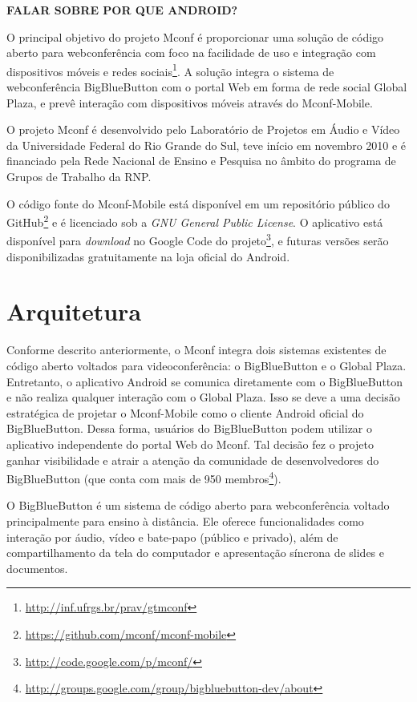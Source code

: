 \documentclass{acm_proc_article-sp}
\newcommand{\todo}[1]{\textcolor[rgb]{1.00,0.00,0.00}{\bf \uppercase{#1}}}
\begin{document}
\todo{falar sobre por que android?}

O principal objetivo do projeto Mconf é proporcionar uma solução de código aberto para webconferência com foco na facilidade de uso e integração com dispositivos móveis e redes sociais\footnote{\url{http://inf.ufrgs.br/prav/gtmconf}}. A solução integra o sistema de webconferência BigBlueButton com o portal Web em forma de rede social Global Plaza, e prevê interação com dispositivos móveis através do Mconf-Mobile.

O projeto Mconf é desenvolvido pelo Laboratório de Projetos em Áudio e Vídeo da Universidade Federal do Rio Grande do Sul, teve início em novembro 2010 e é financiado pela Rede Nacional de Ensino e Pesquisa no âmbito do programa de Grupos de Trabalho da RNP.

O código fonte do Mconf-Mobile está disponível em um repositório público do GitHub\footnote{\url{https://github.com/mconf/mconf-mobile}} e é licenciado sob a \emph{GNU General Public License}. O aplicativo está disponível para \emph{download} no Google Code do projeto\footnote{\url{http://code.google.com/p/mconf/}}, e futuras versões serão disponibilizadas gratuitamente na loja oficial do Android.


\section{Arquitetura}\label{sec:arquitetura}

Conforme descrito anteriormente, o Mconf integra dois sistemas existentes de código aberto voltados para videoconferência: o BigBlueButton e o Global Plaza. Entretanto, o aplicativo Android se comunica diretamente com o BigBlueButton e não realiza qualquer interação com o Global Plaza. Isso se deve a uma decisão estratégica de projetar o Mconf-Mobile como o cliente Android oficial do BigBlueButton. Dessa forma, usuários do BigBlueButton podem utilizar o aplicativo independente do portal Web do Mconf. Tal decisão fez o projeto ganhar visibilidade e atrair a atenção da comunidade de desenvolvedores do BigBlueButton (que conta com mais de 950 membros\footnote{\url{http://groups.google.com/group/bigbluebutton-dev/about}}).

O BigBlueButton é um sistema de código aberto para webconferência voltado principalmente para ensino à distância. Ele oferece funcionalidades como interação por áudio, vídeo e bate-papo (público e privado), além de compartilhamento da tela do computador e apresentação síncrona de slides e documentos.
\end{document}
